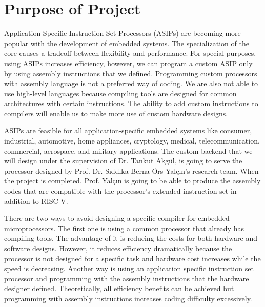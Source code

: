 \section{Purpose of Project}
Application Specific Instruction Set Processors (ASIPs) are becoming more popular with the development of embedded systems. The specialization of the core causes a tradeoff between flexibility and performance. For special purposes, using ASIPs increases efficiency, however, we can program a custom ASIP only by using assembly instructions that we defined. Programming custom processors with assembly language is not a preferred way of coding. We are also not able to use high-level languages because compiling tools are designed for common architectures with certain instructions. The ability to add custom instructions to compilers will enable us to make more use of custom hardware designs.

ASIPs are feasible for all application-specific embedded systems like consumer, industrial, automotive, home appliances, cryptology, medical, telecommunication, commercial, aerospace, and military applications. The custom backend that we will design under the supervision of Dr. Tankut Akgül, is going to serve the processor designed by Prof. Dr. Sıddıka Berna Örs Yalçın’s research team. When the project is completed, Prof. Yalçın is going to be able to produce the assembly codes that are compatible with the processor’s extended instruction set in addition to RISC-V.

There are two ways to avoid designing a specific compiler for embedded microprocessors. The first one is using a common processor that already has compiling tools. The advantage of it is reducing the costs for both hardware and software designs. However, it reduces efficiency dramatically because the processor is not designed for a specific task and hardware cost increases while the speed is decreasing. Another way is using an application specific instruction set processor and programming with the assembly instructions that the hardware designer defined. Theoretically, all efficiency benefits can be achieved but programming with assembly instructions increases coding difficulty excessively.

